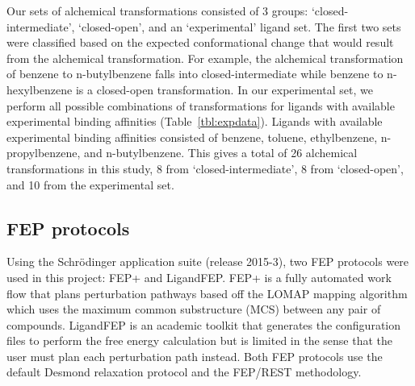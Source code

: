 \documentclass[journal=jctcce,manuscript=article]{achemso}
\begin{document}
Our sets of alchemical transformations consisted of 3 groups: `closed-intermediate', `closed-open', and an `experimental' ligand set.
The first two sets were classified based on the expected conformational change that would result from the alchemical transformation.
For example, the alchemical transformation of benzene to n-butylbenzene falls into closed-intermediate while benzene to n-hexylbenzene is a closed-open transformation.
In our experimental set, we perform all possible combinations of transformations for ligands with available experimental binding affinities (Table~\ref{tbl:expdata}).
Ligands with available experimental binding affinities consisted of benzene, toluene, ethylbenzene, n-propylbenzene, and n-butylbenzene.
This gives a total of 26 alchemical transformations in this study, 8 from `closed-intermediate', 8 from `closed-open', and 10 from the experimental set.
 
\subsection*{FEP protocols}
Using the Schr\"{o}dinger application suite (release 2015-3)\cite{Maestro-Desmond}, two FEP protocols were used in this project: FEP+\cite{FEPplus} and LigandFEP\cite{LigandFEP}.
FEP+ is a fully automated work flow that plans perturbation pathways based off the LOMAP\cite{LOMAP} mapping algorithm which uses the maximum common substructure (MCS) between any pair of compounds.
LigandFEP is an academic toolkit that generates the configuration files to perform the free energy calculation but is limited in the sense that the user must plan each perturbation path instead.
Both FEP protocols use the default Desmond relaxation protocol and the FEP/REST methodology\cite{REST,REST2,FEP/REST,FEP/RESTapp}.
\end{document}
